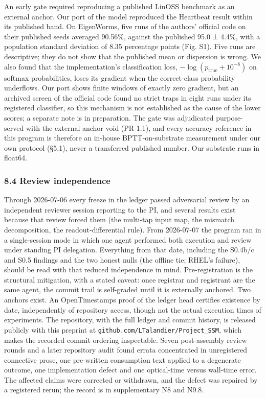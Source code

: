 \documentclass[
  10pt,
]{article}
\begin{document}
An early gate required reproducing a published LinOSS benchmark as an
external anchor. Our port of the model reproduced the Heartbeat result
within its published band. On EigenWorms, five runs of the authors'
official code on their published seeds averaged 90.56\%, against the
published 95.0 ± 4.4\%, with a population standard deviation of 8.35
percentage points (Fig. S1). Five runs are descriptive; they do not show
that the published mean or dispersion is wrong. We also found that the
implementation's classification loss, \(-\log(p_\text{true} + 10^{-8})\)
on softmax probabilities, loses its gradient when the correct-class
probability underflows. Our port shows finite windows of exactly zero
gradient, but an archived screen of the official code found no strict
traps in eight runs under its registered classifier, so this mechanism
is not established as the cause of the lower scores; a separate note is
in preparation. The gate was adjudicated purpose-served with the
external anchor void (PR-1.1), and every accuracy reference in this
program is therefore an in-house BPTT-on-substrate measurement under our
own protocol (§5.1), never a transferred published number. Our substrate
runs in float64.

\subsubsection{8.4 Review independence}\label{review-independence}

Through 2026-07-06 every freeze in the ledger passed adversarial review
by an independent reviewer session reporting to the PI, and several
results exist because that review forced them (the multi-tap input map,
the mismatch decomposition, the readout-differential rule). From
2026-07-07 the program ran in a single-session mode in which one agent
performed both execution and review under standing PI delegation.
Everything from that date, including the S0.4b/c and S0.5 findings and
the two honest nulls (the offline tie; RHEL's failure), should be read
with that reduced independence in mind. Pre-registration is the
structural mitigation, with a stated caveat: once registrar and
registrant are the same agent, the commit trail is self-graded until it
is externally anchored. Two anchors exist. An OpenTimestamps proof of
the ledger head certifies existence by date, independently of repository
access, though not the actual execution times of experiments. The
repository, with the full ledger and commit history, is released
publicly with this preprint at
\texttt{github.com/LTalandier/Project\_SSM}, which makes the recorded
commit ordering inspectable. Seven post-assembly review rounds and a
later repository audit found errata concentrated in unregistered
connective prose, one pre-written consumption text applied to a
degenerate outcome, one implementation defect and one optical-time
versus wall-time error. The affected claims were corrected or withdrawn,
and the defect was repaired by a registered rerun; the record is in
supplementary N8 and N9.8.
\end{document}
